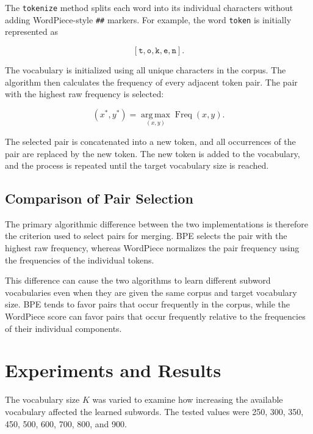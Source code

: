 \documentclass[sigconf]{acmart}
\begin{document}
The \texttt{tokenize} method splits each word into its individual
characters without adding WordPiece-style \texttt{\#\#} markers. For
example, the word \texttt{token} is initially represented as

\[
[\texttt{t},\texttt{o},\texttt{k},\texttt{e},\texttt{n}].
\]

The vocabulary is initialized using all unique characters in the
corpus. The algorithm then calculates the frequency of every adjacent
token pair. The pair with the highest raw frequency is selected:

\[
(x^*,y^*)
=
\underset{(x,y)}{\operatorname{arg\,max}}
\operatorname{Freq}(x,y).
\]

The selected pair is concatenated into a new token, and all occurrences
of the pair are replaced by the new token. The new token is added to
the vocabulary, and the process is repeated until the target vocabulary
size is reached.

\subsection{Comparison of Pair Selection}

The primary algorithmic difference between the two implementations is
therefore the criterion used to select pairs for merging. BPE selects
the pair with the highest raw frequency, whereas WordPiece normalizes
the pair frequency using the frequencies of the individual tokens.

This difference can cause the two algorithms to learn different
subword vocabularies even when they are given the same corpus and target
vocabulary size. BPE tends to favor pairs that occur frequently in the
corpus, while the WordPiece score can favor pairs that occur frequently
relative to the frequencies of their individual components.

\section{Experiments and Results}

The vocabulary size \(K\) was varied to examine how increasing the
available vocabulary affected the learned subwords. The tested values
were 250, 300, 350, 450, 500, 600, 700, 800, and 900.
\end{document}
